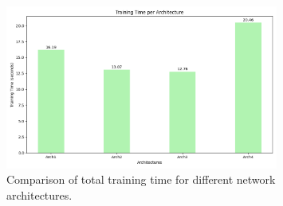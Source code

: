 \documentclass[11pt]{article}
\begin{document}
\begin{figure}[H]
  \centering
  \includegraphics[width=0.8\textwidth]{results/architecture_training_time.png}
  \caption{Comparison of total training time for different network architectures.}
  \label{fig:network_architecture_training_time_comparison}
\end{figure}
\end{document}
